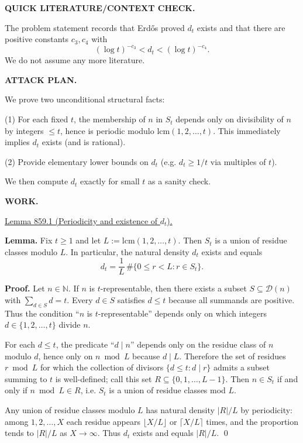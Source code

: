 \medskip
\noindent\textbf{QUICK LITERATURE/CONTEXT CHECK.}

The problem statement records that Erd\H{o}s proved $d_t$ exists and that there are positive constants $c_3,c_4$ with
\[
(\log t)^{-c_3} < d_t < (\log t)^{-c_4}.
\]
We do not assume any more literature.

\medskip
\noindent\textbf{ATTACK PLAN.}

We prove two unconditional structural facts:

(1) For each fixed $t$, the membership of $n$ in $S_t$ depends only on divisibility of $n$ by integers $\le t$, hence is periodic modulo $\mathrm{lcm}(1,2,\dots,t)$. This immediately implies $d_t$ exists (and is rational).

(2) Provide elementary lower bounds on $d_t$ (e.g. $d_t\ge 1/t$ via multiples of $t$).

We then compute $d_t$ exactly for small $t$ as a sanity check.

\medskip
\noindent\textbf{WORK.}

\medskip
\noindent\underline{Lemma 859.1 (Periodicity and existence of $d_t$).}

\textbf{Lemma.}
Fix $t\ge 1$ and let $L:=\mathrm{lcm}(1,2,\dots,t)$. Then $S_t$ is a union of residue classes modulo $L$. In particular, the natural density $d_t$ exists and equals
\[
 d_t = \frac{1}{L}\,\#\{0\le r<L : r\in S_t\}.
\]

\textbf{Proof.}
Let $n\in\mathbb N$.
If $n$ is $t$-representable, then there exists a subset $S\subseteq\mathcal D(n)$ with $\sum_{d\in S} d=t$. Every $d\in S$ satisfies $d\le t$ because all summands are positive.
Thus the condition ``$n$ is $t$-representable'' depends only on which integers $d\in\{1,2,\dots,t\}$ divide $n$.

For each $d\le t$, the predicate ``$d\mid n$'' depends only on the residue class of $n$ modulo $d$, hence only on $n\bmod L$ because $d\mid L$.
Therefore the set of residues $r\bmod L$ for which the collection of divisors $\{d\le t: d\mid r\}$ admits a subset summing to $t$ is well-defined; call this set $R\subseteq\{0,1,\dots,L-1\}$.
Then $n\in S_t$ if and only if $n\bmod L\in R$, i.e. $S_t$ is a union of residue classes mod $L$.

Any union of residue classes modulo $L$ has natural density $|R|/L$ by periodicity: among $1,2,\dots,X$ each residue appears $\lfloor X/L\rfloor$ or $\lceil X/L\rceil$ times, and the proportion tends to $|R|/L$ as $X\to\infty$.
Thus $d_t$ exists and equals $|R|/L$.
\qed

